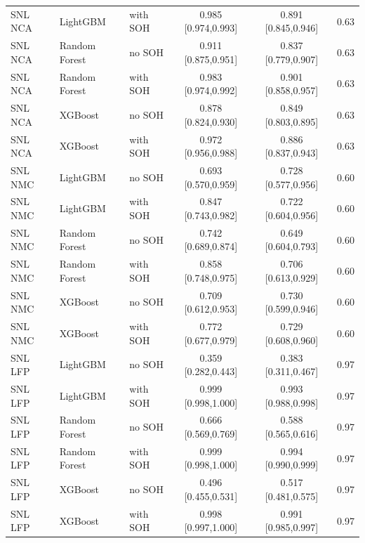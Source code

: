 \documentclass[preprint,12pt]{elsarticle}
\begin{document}
\begin{table}[!t]
{\begin{tabular}{lllccc}
SNL NCA & LightGBM & with SOH & 0.985 [0.974,0.993] & 0.891 [0.845,0.946] & 0.63 \\
SNL NCA & Random Forest & no SOH & 0.911 [0.875,0.951] & 0.837 [0.779,0.907] & 0.63 \\
SNL NCA & Random Forest & with SOH & 0.983 [0.974,0.992] & 0.901 [0.858,0.957] & 0.63 \\
SNL NCA & XGBoost & no SOH & 0.878 [0.824,0.930] & 0.849 [0.803,0.895] & 0.63 \\
SNL NCA & XGBoost & with SOH & 0.972 [0.956,0.988] & 0.886 [0.837,0.943] & 0.63 \\
SNL NMC & LightGBM & no SOH & 0.693 [0.570,0.959] & 0.728 [0.577,0.956] & 0.60 \\
SNL NMC & LightGBM & with SOH & 0.847 [0.743,0.982] & 0.722 [0.604,0.956] & 0.60 \\
SNL NMC & Random Forest & no SOH & 0.742 [0.689,0.874] & 0.649 [0.604,0.793] & 0.60 \\
SNL NMC & Random Forest & with SOH & 0.858 [0.748,0.975] & 0.706 [0.613,0.929] & 0.60 \\
SNL NMC & XGBoost & no SOH & 0.709 [0.612,0.953] & 0.730 [0.599,0.946] & 0.60 \\
SNL NMC & XGBoost & with SOH & 0.772 [0.677,0.979] & 0.729 [0.608,0.960] & 0.60 \\
SNL LFP & LightGBM & no SOH & 0.359 [0.282,0.443] & 0.383 [0.311,0.467] & 0.97 \\
SNL LFP & LightGBM & with SOH & 0.999 [0.998,1.000] & 0.993 [0.988,0.998] & 0.97 \\
SNL LFP & Random Forest & no SOH & 0.666 [0.569,0.769] & 0.588 [0.565,0.616] & 0.97 \\
SNL LFP & Random Forest & with SOH & 0.999 [0.998,1.000] & 0.994 [0.990,0.999] & 0.97 \\
SNL LFP & XGBoost & no SOH & 0.496 [0.455,0.531] & 0.517 [0.481,0.575] & 0.97 \\
SNL LFP & XGBoost & with SOH & 0.998 [0.997,1.000] & 0.991 [0.985,0.997] & 0.97 \\
\bottomrule
\end{tabular}}
\end{table}
\end{document}
